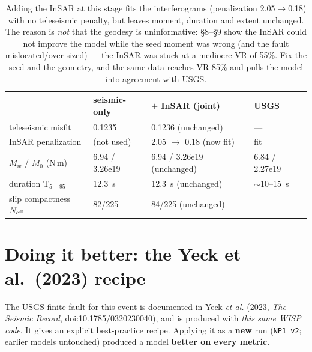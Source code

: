 \documentclass[11pt]{article}
\begin{document}
\begin{table}[H]\centering\small
\begin{tabular}{llll}
\toprule
 & seismic-only & $+$ InSAR (joint) & USGS \\
\midrule
teleseismic misfit & 0.1235 & 0.1236 (unchanged) & --- \\
InSAR penalization & (not used) & 2.05 $\to$ 0.18 (now fit) & fit \\
$M_w$ / $M_0$ (N\,m) & 6.94 / 3.26e19 & 6.94 / 3.26e19 (unchanged) & 6.84 / 2.27e19 \\
duration T$_{5-95}$ & 12.3~s & 12.3~s (unchanged) & $\sim$10--15~s \\
slip compactness $N_{\rm eff}$ & 82/225 & 84/225 (unchanged) & --- \\
\bottomrule
\end{tabular}
\caption{Adding the InSAR at this stage fits the interferograms (penalization 2.05$\to$0.18) with no
teleseismic penalty, but leaves moment, duration and extent unchanged. The reason is \emph{not} that
the geodesy is uninformative: \S8--\S9 show the InSAR could not improve the model while the seed
moment was wrong (and the fault mislocated/over-sized) --- the InSAR was stuck at a mediocre VR of
55\%. Fix the seed and the geometry, and the same data reaches VR 85\% and pulls the model into
agreement with USGS.}
\end{table}

\section{Doing it better: the Yeck et al.\ (2023) recipe}
The USGS finite fault for this event is documented in Yeck \emph{et al.} (2023, \emph{The Seismic
Record}, doi:10.1785/0320230040), and is produced with \emph{this same WISP code}. It gives an
explicit best-practice recipe. Applying it as a \textbf{new} run (\texttt{NP1\_v2}; earlier models
untouched) produced a model \textbf{better on every metric}.
\end{document}
